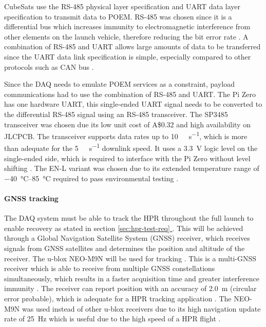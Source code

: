 \documentclass[a4paper,11pt]{article}
\newcommand*{\fullref}[1]{\hyperref[{#1}]{\ref*{#1} \nameref*{#1}}}
\newcommand{\aud}{A\$}
\begin{document}
CubeSats use the RS-485 physical layer specification and UART data layer specification to transmit data to POEM. RS-485 was chosen since it is a differential bus which increases immunity to electromagnetic interference from other elements on the launch vehicle, therefore reducing the bit error rate \cite{cratere2024board}. A combination of RS-485 and UART allows large amounts of data to be transferred since the UART data link specification is simple, especially compared to other protocols such as CAN bus \cite{cratere2024board}.

Since the DAQ needs to emulate POEM services as a constraint, payload communications had to use the combination of RS-485 and UART. The Pi Zero has one hardware UART, this single-ended UART signal needs to be converted to the differential RS-485 signal using an RS-485 transceiver. The SP3485 transceiver was chosen due its low unit cost of \aud 0.32 and high availability on JLCPCB. The transceiver supports data rates up to \SI{10}{\mega\bit\per\second}, which is more than adequate for the \SI{5}{\kilo\bit\per\second} downlink speed. It uses a \SI{3.3}{\volt} logic level on the single-ended side, which is required to interface with the Pi Zero without level shifting \cite{maxlinear2021sp3485}. The EN-L variant was chosen due to its extended temperature range of \SIrange{-40}{85}{\degreeCelsius} required to pass environmental testing \cite{maxlinear2021sp3485}.

\paragraph{GNSS tracking}

The DAQ system must be able to track the HPR throughout the full launch to enable recovery as stated in section \fullref{sec:hpr-test-req}. This will be achieved through a Global Navigation Satellite System (GNSS) receiver, which receives signals from GNSS satellites and determines the position and altitude of the receiver. The u-blox NEO-M9N will be used for tracking \cite{ublox2023neo_m9n_datasheet}. This is a multi-GNSS receiver which is able to receive from multiple GNSS constellations simultaneously, which results in a faster acquisition time and greater interference immunity \cite{ublox2023neo_m9n_datasheet}. The receiver can report position with an accuracy of \SI{2.0}{\metre} (circular error probable), which is adequate for a HPR tracking application \cite{ublox2023neo_m9n_datasheet}. The NEO-M9N was used instead of other u-blox receivers due to its high navigation update rate of \SI{25}{\hertz} which is useful due to the high speed of a HPR flight \cite{ublox2023neo_m9n_datasheet}.
\end{document}
